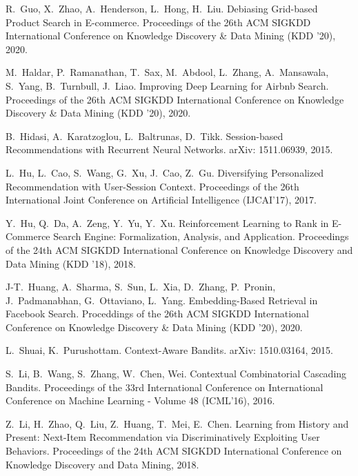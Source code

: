 \documentclass[11pt, dvipdfmx]{article}
\begin{document}
\begin{thebibliography}{10}
\begin{small}
 R.~Guo, X.~Zhao, A.~Henderson, L.~Hong, H.~Liu.
\newblock Debiasing Grid-based Product Search in E-commerce.
\newblock Proceedings of the 26th ACM SIGKDD International Conference on Knowledge Discovery \& Data Mining (KDD '20), 2020.

 M.~Haldar, P.~Ramanathan, T.~Sax, M.~Abdool, L.~Zhang, A.~Mansawala, S.~Yang, B.~Turnbull, J.~Liao.
\newblock Improving Deep Learning for Airbnb Search.
\newblock Proceedings of the 26th ACM SIGKDD International Conference on Knowledge Discovery \& Data Mining (KDD '20), 2020.

 B.~Hidasi, A.~Karatzoglou, L.~Baltrunas, D.~Tikk.
\newblock Session-based Recommendations with Recurrent Neural Networks.
\newblock arXiv: 1511.06939, 2015.

 L.~Hu, L.~Cao, S.~Wang, G.~Xu, J.~Cao, Z.~Gu.
\newblock Diversifying Personalized Recommendation with User-Session Context.
\newblock Proceedings of the 26th International Joint Conference on Artificial Intelligence (IJCAI’17), 2017.


 Y.~Hu, Q.~Da, A.~Zeng, Y.~Yu, Y.~Xu.
\newblock Reinforcement Learning to Rank in E-Commerce Search Engine: Formalization, Analysis, and Application.
\newblock Proceedings of the 24th ACM SIGKDD International Conference on Knowledge Discovery and Data Mining (KDD ’18), 2018.

 J-T.~Huang, A.~Sharma, S.~Sun, L.~Xia, D.~Zhang, P.~Pronin, J.~Padmanabhan, G.~Ottaviano, L.~Yang.
\newblock Embedding-Based Retrieval in Facebook Search. 
\newblock Proceddings of the 26th ACM SIGKDD International Conference on Knowledge Discovery \& Data Mining (KDD '20), 2020. 

 L.~Shuai, K.~Purushottam.
\newblock Context-Aware Bandits.
\newblock arXiv: 1510.03164, 2015.

S.~Li, B.~Wang, S.~Zhang, W.~Chen, Wei.
\newblock Contextual Combinatorial Cascading Bandits.
\newblock Proceedings of the 33rd International Conference on International Conference on Machine Learning - Volume 48 (ICML'16), 2016.

 Z.~Li,  H.~Zhao, Q.~Liu, Z.~Huang, T.~Mei, E.~Chen. \newblock Learning from History and Present: Next-Item Recommendation via Discriminatively Exploiting User Behaviors. \newblock Proceedings of the 24th ACM SIGKDD International Conference on Knowledge Discovery and Data Mining, 2018.


\end{small}
\end{thebibliography}
\end{document}
